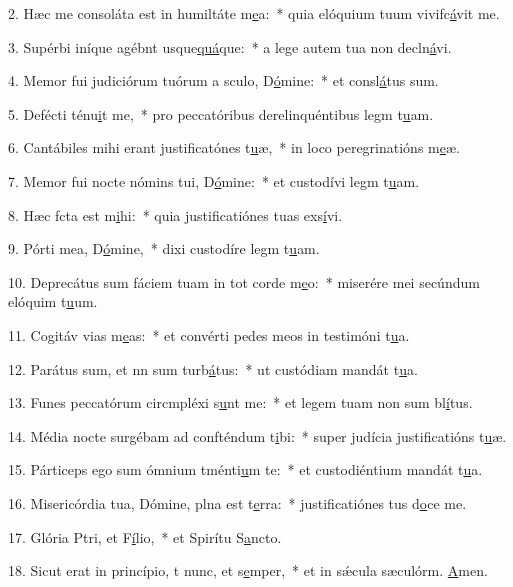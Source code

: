 2. Hæc me consoláta est in humiltáte m\uline{e}a:~* quia elóquium tuum vivifc\uline{á}vit me.\par 
3. Supérbi iníque agébnt usque\uline{quá}que:~* a lege autem tua non decln\uline{á}vi.\par 
4. Memor fui judiciórum tuórum a sculo, D\uline{ó}mine:~* et consl\uline{á}tus sum.\par 
5. Defécti ténu\uline{i}t me,~* pro peccatóribus derelinquéntibus legm t\uline{u}am.\par 
6. Cantábiles mihi erant justificatónes t\uline{u}æ,~* in loco peregrinatións m\uline{e}æ.\par 
7. Memor fui nocte nómins tui, D\uline{ó}mine:~* et custodívi legm t\uline{u}am.\par 
8. Hæc fcta est m\uline{i}hi:~* quia justificatiónes tuas exs\uline{í}vi.\par 
9. Pórti mea, D\uline{ó}mine,~* dixi custodíre legm t\uline{u}am.\par 
10. Deprecátus sum fáciem tuam in tot corde m\uline{e}o:~* miserére mei secúndum elóquim t\uline{u}um.\par 
11. Cogitáv vias m\uline{e}as:~* et convérti pedes meos in testimóni t\uline{u}a.\par 
12. Parátus sum, et nn sum turb\uline{á}tus:~* ut custódiam mandát t\uline{u}a.\par 
13. Funes peccatórum circmpléxi s\uline{u}nt me:~* et legem tuam non sum bl\uline{í}tus.\par 
14. Média nocte surgébam ad confténdum t\uline{i}bi:~* super judícia justificatións t\uline{u}æ.\par 
15. Párticeps ego sum ómnium tménti\uline{u}m te:~* et custodiéntium mandát t\uline{u}a.\par 
16. Misericórdia tua, Dómine, plna est t\uline{e}rra:~* justificatiónes tus d\uline{o}ce me.\par 
17. Glória Ptri, et F\uline{í}lio,~* et Spirítu S\uline{a}ncto.\par 
18. Sicut erat in princípio, t nunc, et s\uline{e}mper,~* et in sǽcula sæculórm. \uline{A}men.\par 
